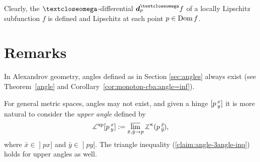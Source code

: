Clearly, the  $\o$-differential $\dd_p^\o f$ of a locally Lipschitz subfunction $f$ is defined and Lipschitz at each point $p\in \Dom f$.


\section{Remarks}
\label{page:upper-angle}
In Alexandrov geometry, angles defined as in Section \ref{sec:angles} always exist (see Theorem~\ref{angle} and Corollary~\ref{cor:monoton-cba:angle=inf}).

For general metric spaces, angles may not exist, 
and given a hinge $[p\,{}^{x}_{y}]$  it is more natural to consider the \emph{upper angle}  defined by
\[\mangle^\text{up}\hinge p x y
\df
\limsup_{\bar x,\bar y\to p} \angk\kappa p{\bar x}{\bar y},\]
where $\bar x\in\mathopen{]}p x]$ and $\bar y\in\mathopen{]}p y]$.
The triangle inequality (\ref{claim:angle-3angle-inq}) holds for upper angles as well.
